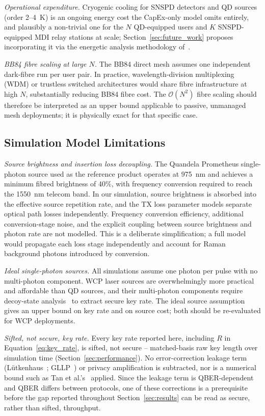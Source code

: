 \documentclass[12pt]{article}
\begin{document}
\textit{Operational expenditure.} Cryogenic cooling for SNSPD detectors and QD sources (order 2--4~K) is an ongoing energy cost the CapEx-only model omits entirely, and plausibly a non-trivial one for the $N$ QD-equipped users and $K$ SNSPD-equipped MDI relay stations at scale; Section~\ref{sec:future_work} proposes incorporating it via the energetic analysis methodology of~\cite{Yehia_2025}.

\textit{BB84 fibre scaling at large $N$.} The BB84 direct mesh assumes one independent dark-fibre run per user pair. In practice, wavelength-division multiplexing (WDM) or trustless switched architectures would share fibre infrastructure at high $N$, substantially reducing BB84 fibre cost. The $\mathcal{O}(N^2)$ fibre scaling should therefore be interpreted as an upper bound applicable to passive, unmanaged mesh deployments; it is physically exact for that specific case.


\subsection{Simulation Model Limitations}
\label{sec:simulation_limitations}

\textit{Source brightness and insertion loss decoupling.} The Quandela Prometheus single-photon source \cite{QuandelaSPS} used as the reference product operates at 975~nm and achieves a minimum fibred brightness of 40\%, with frequency conversion required to reach the 1550~nm telecom band. In our simulation, source brightness is absorbed into the effective source repetition rate, and the TX loss parameter models separate optical path losses independently. Frequency conversion efficiency, additional conversion-stage noise, and the explicit coupling between source brightness and photon rate are not modelled. This is a deliberate simplification; a full model would propagate each loss stage independently and account for Raman background photons introduced by conversion.

\textit{Ideal single-photon sources.} All simulations assume one photon per pulse with no multi-photon component. WCP laser sources are overwhelmingly more practical and affordable than QD sources, and their multi-photon components require decoy-state analysis~\cite{Lo_decoys} to extract secure key rate. The ideal source assumption gives an upper bound on key rate and on source cost; both should be re-evaluated for WCP deployments.

\textit{Sifted, not secure, key rate.} Every key rate reported here, including $R$ in Equation~\ref{eq:key_rate}, is sifted, not secure -- matched-basis raw key length over simulation time (Section~\ref{sec:performance}). No error-correction leakage term (Lütkenhaus~\cite{Lutkenhaus_2000}; GLLP~\cite{Gottesman_2004}) or privacy amplification is subtracted, nor is a numerical bound such as Tan et al.'s~\cite{Tan_2021} applied. Since the leakage term is QBER-dependent and QBER differs between protocols, one of these corrections is a prerequisite before the gap reported throughout Section~\ref{sec:results} can be read as secure, rather than sifted, throughput.
\end{document}
